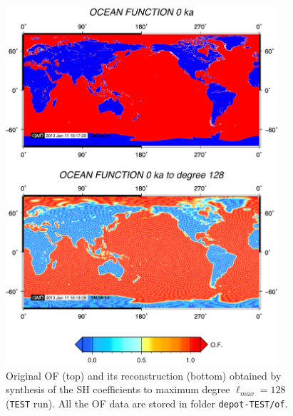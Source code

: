 \documentclass[11pt,fleqn,a4paper,titlepage]{article}
\begin{document}
\begin{figure}[h]
\begin{center}
\includegraphics[angle=0,width=0.9\textwidth]{./Figures/of.png}
\vspace{0cm}
\caption[Ocean function]{\small{Original OF (top) and its reconstruction (bottom) obtained by synthesis of the SH coefficients to maximum degree $\ell_{max}=128$ (\texttt{TEST} run). All the OF data are stored in folder \texttt{depot-TEST/of}}.}
\label{fig:ocean-function}  
\end{center}
\end{figure}
\newpage
\end{document}
